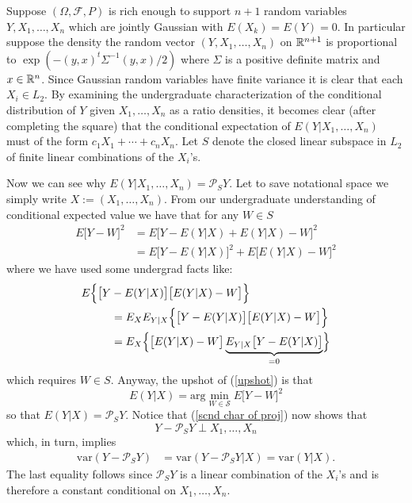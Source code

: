 Suppose $(\Omega, \mathcal F, P)$ is rich enough to support $n+1$ random variables $Y, X_1, \ldots, X_n$ which are jointly Gaussian with $E(X_k) = E(Y) = 0$. In particular suppose the density the random vector $(Y, X_1, \ldots, X_n)$ on $\Bbb R^{n+1}$ is proportional to $\exp(- (y,x)^t \Sigma^{-1} (y, x)/2)$ where $\Sigma$ is a positive definite matrix and $x\in \Bbb R^n$. Since Gaussian random variables have finite variance it is clear that each $X_i\in L_2$.  By examining the undergraduate characterization of the conditional distribution of $Y$ given $X_1, \ldots, X_n$ as a ratio densities, it becomes clear (after completing the square) that the conditional expectation of $E(Y | X_1, \ldots, X_n)$ must of the form $c_1 X_1  +\cdots + c_nX_n$. Let $S$ denote the closed linear subspace in $L_2$ of finite linear combinations of the $X_i$'s.

Now we can see why $E(Y| X_1, \ldots, X_n) = \mathcal P_S Y$. Let to save notational space we simply write $X:= (X_1, \ldots, X_n)$.
From our undergraduate understanding of conditional expected value we have that for any $W\in S$
\begin{align}
\nonumber
E\bigl[Y - W\bigr]^2  &= E\bigl[ Y - E(Y|X) + E(Y|X)- W\bigr]^2 \\
&= E\bigl[ Y - E(Y|X)\bigr]^2 + E\bigl[ E(Y|X)- W\bigr]^2
\label{upshot}
\end{align}
where we have used some undergrad facts like:
\begin{align*}
E\Bigl\{ \bigl[ Y &- E(Y|X)\bigr] \bigl[ E(Y|X)- W\bigr]\Bigr\}  \\
&=  E_{X}E_{Y|X}\Bigl\{\bigl[ Y - E(Y|X)\bigr] \bigl[ E(Y|X)- W\bigr]\Bigr\}  \\
&=  E_{X} \Bigl\{ \bigl[ E(Y|X)- W\bigr]  \underbrace{E_{Y|X}\bigl[ Y - E(Y|X)\bigr]}_{=0}\Bigr\}
\end{align*}
which requires $W\in S$. Anyway, the upshot of (\ref{upshot})  is that
\[ E(Y|X) = \text{arg}\min_{W\in \mathcal S} E\bigl[Y - W\bigr]^2   \]
so that $E(Y|X) = \mathcal P_S Y$. Notice that (\ref{scnd char of proj}) now shows that
\[ Y - \mathcal P_S Y \perp X_1, \ldots, X_n  \]
which, in turn, implies
\begin{align}
\text{var}( Y - \mathcal P_S Y ) & = \text{var}( Y - \mathcal P_S Y|  X  ) = \text{var}( Y | X  ) \label{Gauss variance}.
\end{align}
The last equality follows since $\mathcal P_S Y$ is a linear combination of the $X_i$'s  and is therefore a constant conditional on $X_1, \ldots, X_n$.


